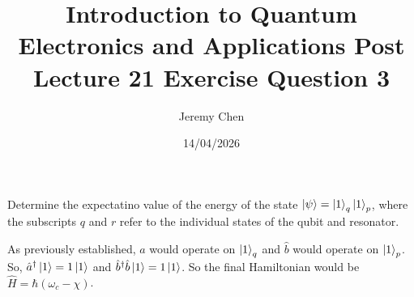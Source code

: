 \documentclass[10pt,letterpaper]{article}
\title{Introduction to Quantum Electronics and Applications Post Lecture 21 Exercise Question 3}
\author{Jeremy Chen}
\date{14/04/2026}
\begin{document}
	\maketitle
	
\noindent Determine the expectatino value of the energy of the state $\ket{\psi} = \ket{1}_{q}\ket{1}_{p}$, where the subscripts $q$ and $r$ refer to the individual states of the qubit and resonator.

\color{violet}
As previously established, $\hat{a}$ would operate on $\ket{1}_{q}$ and $\hat{b}$ would operate on $\ket{1}_{p}$. So, $\hat{a}^{\dagger}\ket{1} = 1\ket{1}$ and $\hat{b}^{\dagger}\hat{b}\ket{1} = 1\ket{1}$. So the final Hamiltonian would be $\hat{H} = \hbar(\omega_{c} - \chi)$. 
\color{black}
\end{document}
